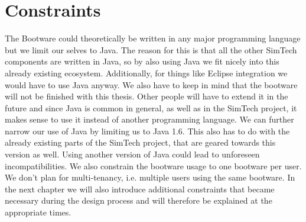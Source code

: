 \section{Constraints}

The Bootware could theoretically be written in any major programming language but we limit our selves to Java.
The reason for this is that all the other SimTech components are written in Java, so by also using Java we fit nicely into this already existing ecosystem.
Additionally, for things like Eclipse integration we would have to use Java anyway.
We also have to keep in mind that the bootware will not be finished with this thesis.
Other people will have to extend it in the future and since Java is common in general, as well as in the SimTech project, it makes sense to use it instead of another programming language.
We can further narrow our use of Java by limiting us to Java 1.6.
This also has to do with the already existing parts of the SimTech project, that are geared towards this version as well.
Using another version of Java could lead to unforeseen incompatibilities.
We also constrain the bootware usage to one bootware per user.
We don't plan for multi-tenancy, i.e. multiple users using the same bootware.
In the next chapter we will also introduce additional constraints that became necessary during the design process and will therefore be explained at the appropriate times.
